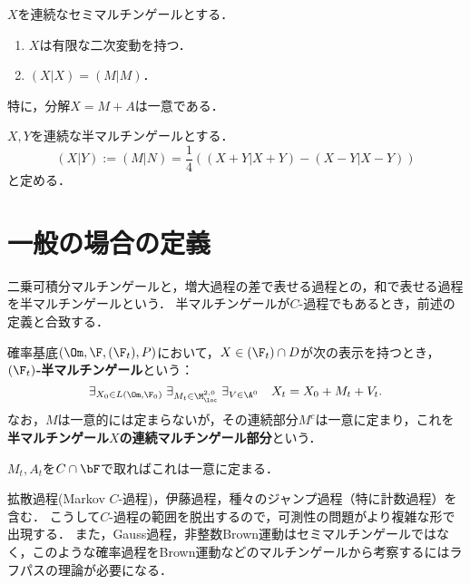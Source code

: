 \documentclass[uplatex,dvipdfmx]{jsreport}
\begin{document}
\begin{proposition}
    $X$を連続なセミマルチンゲールとする．
    \begin{enumerate}
        \item $X$は有限な二次変動を持つ．
        \item $(X|X)=(M|M)$．
    \end{enumerate}
    特に，分解$X=M+A$は一意である．
\end{proposition}

\begin{definition}
    $X,Y$を連続な半マルチンゲールとする．
    \[(X|Y):=(M|N)=\frac{1}{4}((X+Y|X+Y)-(X-Y|X-Y))\]
    と定める．
\end{definition}

\section{一般の場合の定義}

\begin{tcolorbox}[colframe=ForestGreen, colback=ForestGreen!10!white,breakable,colbacktitle=ForestGreen!40!white,coltitle=black,fonttitle=\bfseries\sffamily,
title=]
    二乗可積分マルチンゲールと，増大過程の差で表せる過程との，和で表せる過程を半マルチンゲールという．
    半マルチンゲールが$C$-過程でもあるとき，前述の定義と合致する．
\end{tcolorbox}

\begin{definition}[semimartingale]
    確率基底$(\Om,\F,(\F_t),P)$において，$X\in(\F_t)\cap D$が次の表示を持つとき，\textbf{$(\F_t)$-半マルチンゲール}という：
    \[\exists_{X_0\in L(\Om,\F_0)}\;\exists_{M_t\in\M^{2,0}_\loc}\;\exists_{V\in\A^0}\quad X_t=X_0+M_t+V_t.\]
    なお，$M$は一意的には定まらないが，その連続部分$M^c$は一意に定まり，これを\textbf{半マルチンゲール$X$の連続マルチンゲール部分}という．
\end{definition}
\begin{remarks}
    $M_t,A_t$を$C\cap\bF$で取ればこれは一意に定まる．
\end{remarks}

\begin{example}
    拡散過程(Markov $C$-過程)，伊藤過程，種々のジャンプ過程（特に計数過程）を含む．
    こうして$C$-過程の範囲を脱出するので，可測性の問題がより複雑な形で出現する．
    また，Gauss過程，非整数Brown運動はセミマルチンゲールではなく，このような確率過程をBrown運動などのマルチンゲールから考察するにはラフパスの理論が必要になる．
\end{example}
\end{document}

